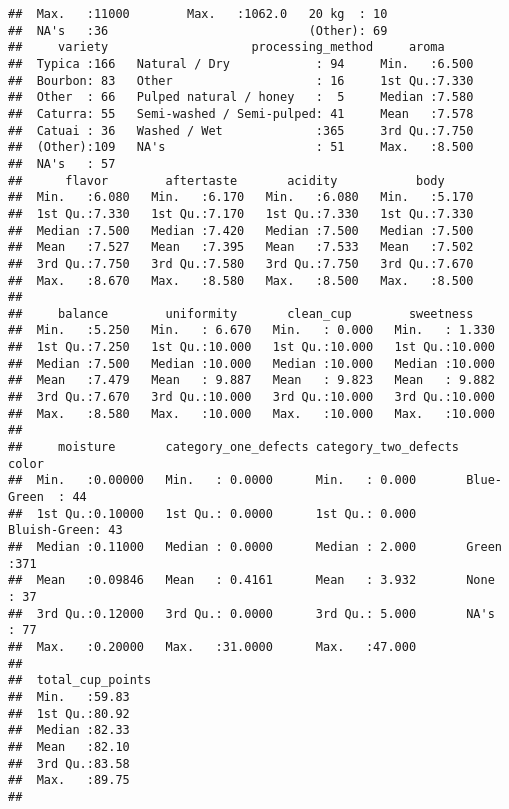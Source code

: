 \documentclass[
]{article}
\begin{document}
\begin{verbatim}
##  Max.   :11000        Max.   :1062.0   20 kg  : 10                
##  NA's   :36                            (Other): 69                
##     variety                    processing_method     aroma      
##  Typica :166   Natural / Dry            : 94     Min.   :6.500  
##  Bourbon: 83   Other                    : 16     1st Qu.:7.330  
##  Other  : 66   Pulped natural / honey   :  5     Median :7.580  
##  Caturra: 55   Semi-washed / Semi-pulped: 41     Mean   :7.578  
##  Catuai : 36   Washed / Wet             :365     3rd Qu.:7.750  
##  (Other):109   NA's                     : 51     Max.   :8.500  
##  NA's   : 57                                                    
##      flavor        aftertaste       acidity           body      
##  Min.   :6.080   Min.   :6.170   Min.   :6.080   Min.   :5.170  
##  1st Qu.:7.330   1st Qu.:7.170   1st Qu.:7.330   1st Qu.:7.330  
##  Median :7.500   Median :7.420   Median :7.500   Median :7.500  
##  Mean   :7.527   Mean   :7.395   Mean   :7.533   Mean   :7.502  
##  3rd Qu.:7.750   3rd Qu.:7.580   3rd Qu.:7.750   3rd Qu.:7.670  
##  Max.   :8.670   Max.   :8.580   Max.   :8.500   Max.   :8.500  
##                                                                 
##     balance        uniformity       clean_cup        sweetness     
##  Min.   :5.250   Min.   : 6.670   Min.   : 0.000   Min.   : 1.330  
##  1st Qu.:7.250   1st Qu.:10.000   1st Qu.:10.000   1st Qu.:10.000  
##  Median :7.500   Median :10.000   Median :10.000   Median :10.000  
##  Mean   :7.479   Mean   : 9.887   Mean   : 9.823   Mean   : 9.882  
##  3rd Qu.:7.670   3rd Qu.:10.000   3rd Qu.:10.000   3rd Qu.:10.000  
##  Max.   :8.580   Max.   :10.000   Max.   :10.000   Max.   :10.000  
##                                                                    
##     moisture       category_one_defects category_two_defects          color    
##  Min.   :0.00000   Min.   : 0.0000      Min.   : 0.000       Blue-Green  : 44  
##  1st Qu.:0.10000   1st Qu.: 0.0000      1st Qu.: 0.000       Bluish-Green: 43  
##  Median :0.11000   Median : 0.0000      Median : 2.000       Green       :371  
##  Mean   :0.09846   Mean   : 0.4161      Mean   : 3.932       None        : 37  
##  3rd Qu.:0.12000   3rd Qu.: 0.0000      3rd Qu.: 5.000       NA's        : 77  
##  Max.   :0.20000   Max.   :31.0000      Max.   :47.000                         
##                                                                                
##  total_cup_points
##  Min.   :59.83   
##  1st Qu.:80.92   
##  Median :82.33   
##  Mean   :82.10   
##  3rd Qu.:83.58   
##  Max.   :89.75   
## 
\end{verbatim}
\end{document}
